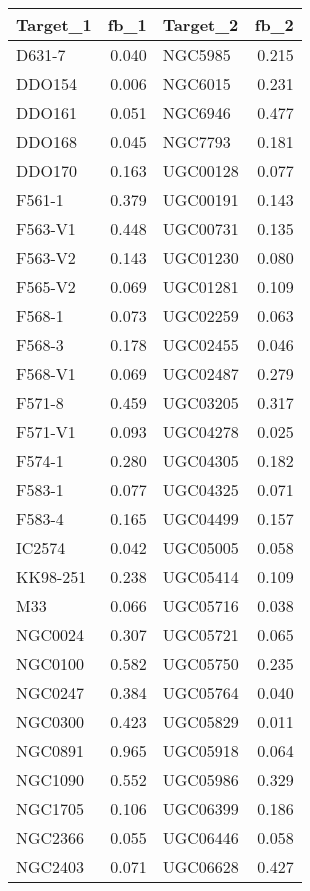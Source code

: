 \begin{tabular}{lrlr}
\toprule
   Target_1 &   fb_1 &  Target_2 &   fb_2 \\
\midrule
     D631-7 &  0.040 &   NGC5985 &  0.215 \\
     DDO154 &  0.006 &   NGC6015 &  0.231 \\
     DDO161 &  0.051 &   NGC6946 &  0.477 \\
     DDO168 &  0.045 &   NGC7793 &  0.181 \\
     DDO170 &  0.163 &  UGC00128 &  0.077 \\
     F561-1 &  0.379 &  UGC00191 &  0.143 \\
    F563-V1 &  0.448 &  UGC00731 &  0.135 \\
    F563-V2 &  0.143 &  UGC01230 &  0.080 \\
    F565-V2 &  0.069 &  UGC01281 &  0.109 \\
     F568-1 &  0.073 &  UGC02259 &  0.063 \\
     F568-3 &  0.178 &  UGC02455 &  0.046 \\
    F568-V1 &  0.069 &  UGC02487 &  0.279 \\
     F571-8 &  0.459 &  UGC03205 &  0.317 \\
    F571-V1 &  0.093 &  UGC04278 &  0.025 \\
     F574-1 &  0.280 &  UGC04305 &  0.182 \\
     F583-1 &  0.077 &  UGC04325 &  0.071 \\
     F583-4 &  0.165 &  UGC04499 &  0.157 \\
     IC2574 &  0.042 &  UGC05005 &  0.058 \\
   KK98-251 &  0.238 &  UGC05414 &  0.109 \\
        M33 &  0.066 &  UGC05716 &  0.038 \\
    NGC0024 &  0.307 &  UGC05721 &  0.065 \\
    NGC0100 &  0.582 &  UGC05750 &  0.235 \\
    NGC0247 &  0.384 &  UGC05764 &  0.040 \\
    NGC0300 &  0.423 &  UGC05829 &  0.011 \\
    NGC0891 &  0.965 &  UGC05918 &  0.064 \\
    NGC1090 &  0.552 &  UGC05986 &  0.329 \\
    NGC1705 &  0.106 &  UGC06399 &  0.186 \\
    NGC2366 &  0.055 &  UGC06446 &  0.058 \\
    NGC2403 &  0.071 &  UGC06628 &  0.427 \\

\end{tabular}
